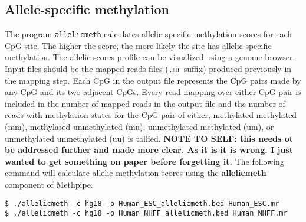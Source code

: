 \documentclass[10pt]{article}
\newcommand{\prog}[1]{\texttt{#1}}
\newcommand{\fn}[1]{\texttt{#1}}
\begin{document}


\subsection{Allele-specific methylation}
\label{sec:allelic_scores}

The program \prog{allelicmeth} calculates allelic-specific
methylation scores for each CpG site. The higher the score, the more
likely the site has allelic-specific methylation. The allelic scores
profile can be visualized using a genome browser. Input files should
be the mapped reads files (\fn{.mr} suffix) produced previously in the
mapping step. Each CpG in the output file represents the CpG pairs
made by any CpG and its two adjacent CpGs. Every read mapping over
either CpG pair is included in the number of mapped reads in the
output file and the number of reads with methylation states for the
CpG pair of either, methylated methylated (mm), methylated
unmethylated (mu), unmethylated methylated (um), or unmethylated
unmethylated (uu) is tallied. \textbf {NOTE TO SELF: this needs ot be
  addressed further and made more clear. As it is it is wrong. I just
  wanted to get something on paper before forgetting it.}  The
following command will calculate allelic methylation scores using the
\textbf{allelicmeth} component of Methpipe.
\begin{verbatim}
$ ./allelicmeth -c hg18 -o Human_ESC_allelicmeth.bed Human_ESC.mr
$ ./allelicmeth -c hg18 -o Human_NHFF_allelicmeth.bed Human_NHFF.mr
\end{verbatim}
\end{document}

